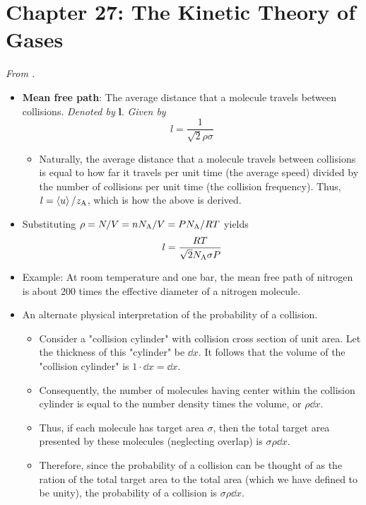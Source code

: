 \documentclass[../notes.tex]{subfiles}
\begin{document}
\section{Chapter 27: The Kinetic Theory of Gases}
\emph{From \textcite{bib:McQuarrieSimon}.}
\begin{itemize}
    \item {}\textbf{Mean free path}: The average distance that a molecule travels between collisions. \emph{Denoted by} $\bm{l}$. \emph{Given by}
    \begin{equation*}
        l = \frac{1}{\sqrt{2}\rho\sigma}
    \end{equation*}
    \begin{itemize}
        \item Naturally, the average distance that a molecule travels between collisions is equal to how far it travels per unit time (the average speed) divided by the number of collisions per unit time (the collision frequency). Thus, $l=\prb{u}/z_{\ce{A}}$, which is how the above is derived.
    \end{itemize}
    \item Substituting $\rho=N/V=nN_\text{A}/V=PN_\text{A}/RT$ yields
    \begin{equation*}
        l = \frac{RT}{\sqrt{2}N_\text{A}\sigma P}
    \end{equation*}
    \item Example: At room temperature and one bar, the mean free path of nitrogen is about 200 times the effective diameter of a nitrogen molecule.
    \item An alternate physical interpretation of the probability of a collision.
    \begin{itemize}
        \item Consider a "collision cylinder" with collision cross section of unit area. Let the thickness of this "cylinder" be $\dd{x}$. It follows that the volume of the "collision cylinder" is $1\cdot\dd{x}=\dd{x}$.
        \item Consequently, the number of molecules having center within the collision cylinder is equal to the number density times the volume, or $\rho\dd{x}$.
        \item Thus, if each molecule has target area $\sigma$, then the total target area presented by these molecules (neglecting overlap) is $\sigma\rho\dd{x}$.
        \item Therefore, since the probability of a collision can be thought of as the ration of the total target area to the total area (which we have defined to be unity), the probability of a collision is $\sigma\rho\dd{x}$.

\end{itemize}
\end{itemize}
\end{document}
